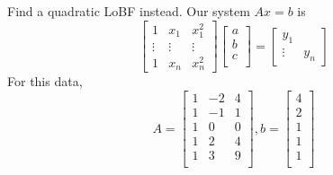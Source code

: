 \documentclass{article}
\begin{document}
    \begin{example}
      Find a quadratic LoBF instead.
      Our system $Ax = b$ is \[
        \begin{bmatrix}
          1 & x_1 & x_1^2\\
          \vdots & \vdots & \vdots\\
          1 & x_n & x_n^2
        \end{bmatrix}
        \begin{bmatrix}
          a\\b\\c\\
        \end{bmatrix} =
        \begin{bmatrix}
          y_1 \\ \vdots & y_n
        \end{bmatrix}
      \]
      For this data, \[
        A =
        \begin{bmatrix}
          1 & -2 & 4\\
          1 & -1 & 1\\
          1 & 0 & 0\\
          1 & 2 & 4\\
          1 & 3 & 9\\
        \end{bmatrix}, b =
        \begin{bmatrix}
          4\\2\\1\\1\\1\\
        \end{bmatrix}
      \]


\end{example}
\end{document}
